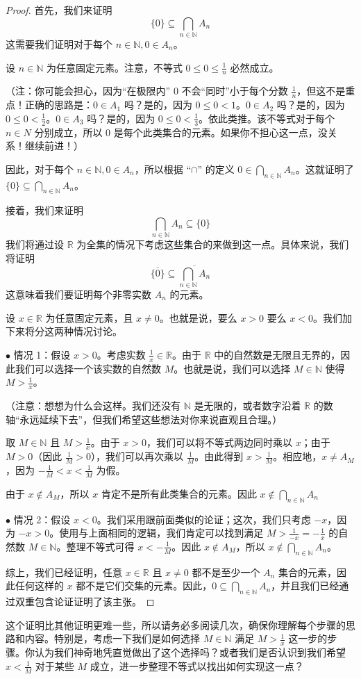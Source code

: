 \begin{proof}
    首先，我们来证明
    \[\{0\} \subseteq \bigcap_{n \in \mathbb{N}}A_n\]
    这需要我们证明对于每个 $n \in \mathbb{N}, 0 \in A_n$。

    设 $n \in \mathbb{N}$ 为任意固定元素。注意，不等式 $0 \le 0 \le \frac{1}{n}$ 必然成立。

    （注：你可能会担心，因为``在极限内'' $0$ 不会``同时''小于每个分数 $\frac{1}{n}$，但这不是重点！正确的思路是：$0 \in A_1$ 吗？是的，因为 $0 \le 0 < 1$。$0 \in A_2$ 吗？是的，因为 $0 \le 0 < \frac{1}{2}$。$0 \in A_3$ 吗？是的，因为 $0 \le 0 < \frac{1}{3}$。依此类推。该不等式对于每个 $n \in N$ 分别成立，所以 $0$ 是每个此类集合的元素。如果你不担心这一点，没关系！继续前进！）

    因此，对于每个 $n \in \mathbb{N}, 0 \in A_n$，所以根据 ``$\cap$'' 的定义 $\displaystyle{0 \in \bigcap_{n \in \mathbb{N}} A_n}$。这就证明了 $\displaystyle{\{0\} \subseteq \bigcap_{n \in \mathbb{N}} A_n}$。

    接着，我们来证明
    \[\bigcap_{n \in \mathbb{N}}A_n \subseteq \{0\}\]
    我们将通过设 $\mathbb{R}$ 为全集的情况下考虑这些集合的来做到这一点。具体来说，我们将证明
    \[\overline{\{0\}} \subseteq \overline{\bigcap_{n \in \mathbb{N}}A_n}\]
    这意味着我们要证明每个非零实数 $A_n$ 的元素。

    设 $x \in \mathbb{R}$ 为任意固定元素，且 $x \ne 0$。也就是说，要么 $x > 0$ 要么 $x < 0$。我们加下来将分这两种情况讨论。

    $\bullet$ 情况 1：假设 $x > 0$。考虑实数 $\frac{1}{x} \in \mathbb{R}$。由于 $\mathbb{R}$ 中的自然数是无限且无界的，因此我们可以选择一个该实数的自然数 $M$。也就是说，我们可以选择 $M \in \mathbb{N}$ 使得 $M > \frac{1}{x}$。

    （注意：想想为什么会这样。我们还没有 $\mathbb{N}$ 是无限的，或者数字沿着 $\mathbb{R}$ 的数轴``永远延续下去''，但我们希望这些想法对你来说直观且合理。）

    取 $M \in \mathbb{N}$ 且 $M > \frac{1}{x}$。由于 $x > 0$，我们可以将不等式两边同时乘以 $x$；由于 $M > 0$（因此 $\frac{1}{M} > 0$），我们可以再次乘以 $\frac{1}{M}$。由此得到 $x > \frac{1}{M}$。相应地，$x \ne A_M$，因为 $-\frac{1}{M} < x < \frac{1}{M}$ 为假。

    由于 $x \notin A_M$，所以 $x$ 肯定不是所有此类集合的元素。因此 $\displaystyle{x \notin \bigcap_{n \in \mathbb{N}} A_n}$

    $\bullet$ 情况 2：假设 $x < 0$。我们采用跟前面类似的论证；这次，我们只考虑 $-x$，因为 $-x > 0$。使用与上面相同的逻辑，我们肯定可以找到满足 $M > \frac{1}{-x} = -\frac{1}{x}$ 的自然数 $M \in \mathbb{N}$。整理不等式可得 $x < -\frac{1}{M}$。因此 $x \notin A_M$，所以 $\displaystyle{x \notin \bigcap_{n \in \mathbb{N}} A_n}$。

    综上，我们已经证明，任意 $x \in \mathbb{R}$ 且 $x \ne 0$ 都不是至少一个 $A_n$ 集合的元素，因此任何这样的 $x$ 都不是它们交集的元素。因此，$\displaystyle{{0} \subseteq \bigcap_{n \in \mathbb{N}} A_n}$，并且我们已经通过双重包含论证证明了该主张。
\end{proof}

这个证明比其他证明更难一些，所以请务必多阅读几次，确保你理解每个步骤的思路和内容。特别是，考虑一下我们是如何选择 $M \in \mathbb{N}$ 满足 $M > \frac{1}{x}$ 这一步的步骤。你认为我们神奇地凭直觉做出了这个选择吗？或者我们是否认识到我们希望 $x < \frac{1}{M}$ 对于某些 $M$ 成立，进一步整理不等式以找出如何实现这一点？
